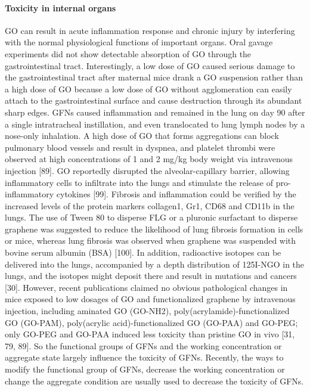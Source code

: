 \documentclass[twoside,twocolumn,9pt]{article}
\begin{document}
\paragraph{Toxicity in internal organs}
GO can result in acute inflammation response and chronic injury by interfering with the normal physiological functions of important organs. Oral gavage experiments did not show detectable absorption of GO through the gastrointestinal tract. Interestingly, a low dose of GO caused serious damage to the gastrointestinal tract after maternal mice drank a GO suspension rather than a high dose of GO because a low dose of GO without agglomeration can easily attach to the gastrointestinal surface and cause destruction through its abundant sharp edges. GFNs caused inflammation and remained in the lung on day 90 after a single intratracheal instillation, and even translocated to lung lymph nodes by a nose-only inhalation. A high dose of GO that forms aggregations can block pulmonary blood vessels and result in dyspnea, and platelet thrombi were observed at high concentrations of 1 and 2 mg/kg body weight via intravenous injection [89]. GO reportedly disrupted the alveolar-capillary barrier, allowing inflammatory cells to infiltrate into the lungs and stimulate the release of pro-inflammatory cytokines [99]. Fibrosis and inflammation could be verified by the increased levels of the protein markers collagen1, Gr1, CD68 and CD11b in the lungs. The use of Tween 80 to disperse FLG or a pluronic surfactant to disperse graphene was suggested to reduce the likelihood of lung fibrosis formation in cells or mice, whereas lung fibrosis was observed when graphene was suspended with bovine serum albumin (BSA) [100]. In addition, radioactive isotopes can be delivered into the lungs, accompanied by a depth distribution of 125I-NGO in the lungs, and the isotopes might deposit there and result in mutations and cancers [30]. However, recent publications claimed no obvious pathological changes in mice exposed to low dosages of GO and functionalized graphene by intravenous injection, including aminated GO (GO-NH2), poly(acrylamide)-functionalized GO (GO-PAM), poly(acrylic acid)-functionalized GO (GO-PAA) and GO-PEG; only GO-PEG and GO-PAA induced less toxicity than pristine GO in vivo [31, 79, 89]. So the functional groups of GFNs and the working concentration or aggregate state largely influence the toxicity of GFNs. Recently, the ways to modify the functional group of GFNs, decrease the working concentration or change the aggregate condition are usually used to decrease the toxicity of GFNs.
\end{document}
